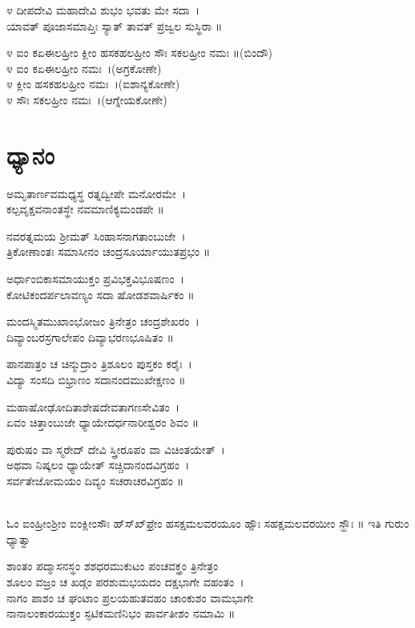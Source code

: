 ೪ ದೀಪದೇವಿ ಮಹಾದೇವಿ ಶುಭಂ ಭವತು ಮೇ ಸದಾ~।\\
ಯಾವತ್ ಪೂಜಾಸಮಾಪ್ತಿಃ ಸ್ಯಾತ್ ತಾವತ್ ಪ್ರಜ್ವಲ ಸುಸ್ಥಿರಾ ॥

೪ ಐಂ ಕಏಈಲಹ್ರೀಂ ಕ್ಲೀಂ ಹಸಕಹಲಹ್ರೀಂ ಸೌಃ ಸಕಲಹ್ರೀಂ ನಮಃ ॥(ಬಿಂದೌ)\\
೪ ಐಂ ಕಏಈಲಹ್ರೀಂ ನಮಃ~।(ಅಗ್ರಕೋಣೇ)\\
೪ ಕ್ಲೀಂ ಹಸಕಹಲಹ್ರೀಂ ನಮಃ~।(ಐಶಾನ್ಯಕೋಣೇ)\\
೪ ಸೌಃ ಸಕಲಹ್ರೀಂ ನಮಃ~।(ಆಗ್ನೇಯಕೋಣೇ)
\section{ಧ್ಯಾನಂ}
ಅಮೃತಾರ್ಣವಮಧ್ಯಸ್ಥ ರತ್ನದ್ವೀಪೇ ಮನೋರಮೇ~।\\
ಕಲ್ಪವೃಕ್ಷವನಾಂತಸ್ಥೇ ನವಮಾಣಿಕ್ಯಮಂಡಪೇ ॥

ನವರತ್ನಮಯ ಶ್ರೀಮತ್ ಸಿಂಹಾಸನಾಗತಾಂಬುಜೇ~।\\
ತ್ರಿಕೋಣಾಂತಃ ಸಮಾಸೀನಂ ಚಂದ್ರಸೂರ್ಯಾಯುತಪ್ರಭಂ ॥

ಅರ್ಧಾಂಬಿಕಾಸಮಾಯುಕ್ತಂ ಪ್ರವಿಭಕ್ತವಿಭೂಷಣಂ~।\\
ಕೋಟಿಕಂದರ್ಪಲಾವಣ್ಯಂ ಸದಾ ಷೋಡಶವಾರ್ಷಿಕಂ ॥

ಮಂದಸ್ಮಿತಮುಖಾಂಭೋಜಂ ತ್ರಿನೇತ್ರಂ ಚಂದ್ರಶೇಖರಂ~।\\
ದಿವ್ಯಾಂಬರಸ್ರಗಾಲೇಪಂ ದಿವ್ಯಾಭರಣಭೂಷಿತಂ ॥

ಪಾನಪಾತ್ರಂ ಚ ಚಿನ್ಮುದ್ರಾಂ ತ್ರಿಶೂಲಂ ಪುಸ್ತಕಂ ಕರೈಃ~।\\
ವಿದ್ಯಾ ಸಂಸದಿ ಬಿಭ್ರಾಣಂ ಸದಾನಂದಮುಖೇಕ್ಷಣಂ ॥

ಮಹಾಷೋಢೋದಿತಾಶೇಷದೇವತಾಗಣಸೇವಿತಂ~।\\
ಏವಂ ಚಿತ್ತಾಂಬುಜೇ ಧ್ಯಾಯೇದರ್ಧನಾರೀಶ್ವರಂ ಶಿವಂ ॥

ಪುರುಷಂ ವಾ ಸ್ಮರೇದ್ ದೇವಿ ಸ್ತ್ರೀರೂಪಂ ವಾ ವಿಚಿಂತಯೇತ್~।\\
ಅಥವಾ ನಿಷ್ಕಲಂ ಧ್ಯಾಯೇತ್ ಸಚ್ಚಿದಾನಂದವಿಗ್ರಹಂ~।\\
ಸರ್ವತೇಜೋಮಯಂ ದಿವ್ಯಂ ಸಚರಾಚರವಿಗ್ರಹಂ ॥

\\
ಓಂ ಐಂಹ್ರೀಂಶ್ರೀಂ ಐಂಕ್ಲೀಂಸೌಃ ಹ್‌ಸ್‌ಖ್‌ಫ್ರೇಂ ಹಸಕ್ಷಮಲವರಯೂಂ ಹ್ಸೌಃ ಸಹಕ್ಷಮಲವರಯೀಂ ಸ್ಹೌಃ ॥ ಇತಿ ಗುರುಂ ಧ್ಯಾತ್ವಾ

ಶಾಂತಂ ಪದ್ಮಾಸನಸ್ಥಂ ಶಶಧರಮುಕುಟಂ ಪಂಚವಕ್ತ್ರಂ ತ್ರಿನೇತ್ರಂ\\
ಶೂಲಂ ವಜ್ರಂ ಚ ಖಡ್ಗಂ ಪರಶುಮಭಯದಂ ದಕ್ಷಭಾಗೇ ವಹಂತಂ~।\\
ನಾಗಂ ಪಾಶಂ ಚ ಘಂಟಾಂ ಪ್ರಲಯಹುತವಹಂ ಚಾಂಕುಶಂ ವಾಮಭಾಗೇ\\
ನಾನಾಲಂಕಾರಯುಕ್ತಂ ಸ್ಫಟಿಕಮಣಿನಿಭಂ ಪಾರ್ವತೀಶಂ ನಮಾಮಿ ॥

